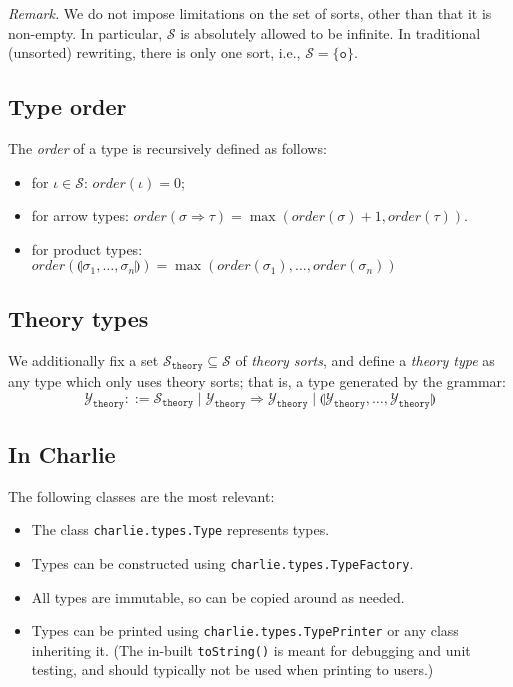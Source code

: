 \documentclass{lmcs}
\theoremstyle{theorem}\newtheorem{theorem}{Theorem}
\theoremstyle{theorem}\newtheorem{lemma}[theorem]{Lemma}
\theoremstyle{theorem}\newtheorem{corollary}[theorem]{Corollary}
\theoremstyle{definition}\newtheorem{definition}[theorem]{Definition}
\theoremstyle{definition}\newtheorem{example}[theorem]{Example}
\newcommand{\Sorts}{\mathcal{S}}
\newcommand{\thSorts}{\mathcal{S}_{\mathtt{theory}}}
\newcommand{\thTypes}{\mathcal{Y}_{\mathtt{theory}}}
\newcommand{\order}{\mathit{order}}
\newcommand{\asort}{\iota}
\newcommand{\atype}{\sigma}
\newcommand{\btype}{\tau}
\newcommand{\product}[2]{\llparenthesis #1,\dots,#2 \rrparenthesis}
\newcommand{\arrtype}{\Rightarrow}
\newcommand{\unitsort}{\mathtt{o}}
\newcommand{\charlie}{\textsf{Charlie}\xspace}
\begin{document}
\medskip
\emph{Remark.} We do not impose limitations on the set of sorts, other than that
it is non-empty.  In particular, $\Sorts$ is absolutely allowed to be infinite.
In traditional (unsorted) rewriting, there is only one sort, i.e., $\Sorts =
\{\unitsort\}$.

\subsection{Type order}

The \emph{order} of a type is recursively defined as follows:
\begin{itemize}
\item for $\asort \in \Sorts$: $\order(\asort) = 0$;
\item for arrow types: $\order(\atype \arrtype \btype) = \max(\order(\atype) +
  1,\order(\btype))$.
\item for product types: $\order(\product{\atype_1}{\atype_n}) =
  \max(\order(\atype_1),\dots,\order(\atype_n))$
\end{itemize}

\subsection{Theory types}

We additionally fix a set $\thSorts \subseteq \Sorts$ of \emph{theory sorts},
and define a \emph{theory type} as any type which only uses theory sorts; that
is, a type generated by the grammar:
\[
\thTypes ::= \thSorts \mid \thTypes \arrtype \thTypes \mid
  \product{\thTypes}{\thTypes}
\]

\subsection*{In \charlie}
The following classes are the most relevant:

\begin{itemize}
\item The class \texttt{charlie.types.Type} represents types.
\item Types can be constructed using \texttt{charlie.types.TypeFactory}.
\item All types are immutable, so can be copied around as needed.
\item Types can be printed using \texttt{charlie.types.TypePrinter} or any class
  inheriting it.
  (The in-built \texttt{toString()} is meant for debugging and unit testing, and
  should typically not be used when printing to users.)
\end{itemize}
\end{document}
